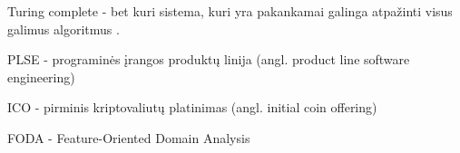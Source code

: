 \documentclass{VUMIFPSkursinis}
\begin{document}
Turing complete - bet kuri sistema, kuri yra pakankamai galinga atpažinti visus galimus algoritmus \cite{Teller1994}. 

PLSE - programinės įrangos produktų linija (angl. product line software engineering)

ICO - pirminis kriptovaliutų platinimas (angl. initial coin offering)

FODA - Feature-Oriented Domain Analysis \cite{Kang1990}

%
\end{document}
